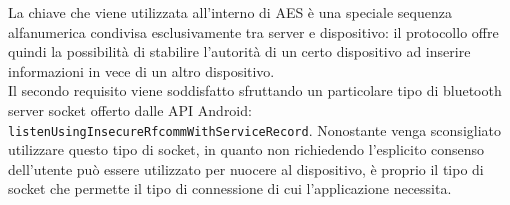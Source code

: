 La chiave che viene utilizzata all'interno di AES è una speciale sequenza alfanumerica condivisa esclusivamente tra server e dispositivo: il protocollo offre quindi la possibilità di stabilire l'autorità di un certo dispositivo ad inserire informazioni in vece di un altro dispositivo.\\

Il secondo requisito viene soddisfatto sfruttando un particolare tipo di bluetooth server socket offerto dalle API Android: \texttt{listen\-Using\-Insecure\-Rfcomm\-With\-Service\-Record}. Nonostante venga sconsigliato utilizzare questo tipo di socket, in quanto non richiedendo l'esplicito consenso dell'utente può essere utilizzato per nuocere al dispositivo, è proprio il tipo di socket che permette il tipo di connessione di cui l'applicazione necessita.

